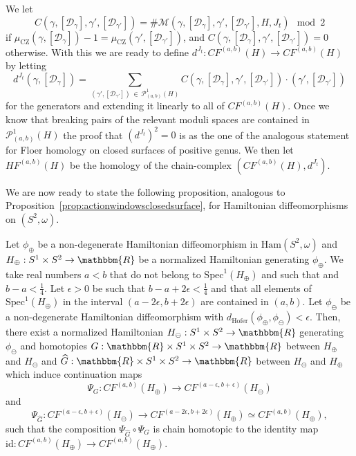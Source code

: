 \documentclass[AHL,Unicode,longabstracts,published]{cedram}
\newcommand{\R}{\mathbbm{R}}
\newcommand{\Ham}{\mathrm{Ham}}
\newcommand{\hofer}{\mathrm{Hofer}}
\newcommand{\Spec}{\mathrm{Spec}}
\newcommand{\rid}{\mathrm{id}}
\newcommand{\rCZ}{\mathrm{CZ}}
\newcommand{\clP}{\mathcal{P}}
\newcommand{\clM}{\mathcal{M}}
\newcommand{\clD}{\mathcal{D}}
\newcommand{\hofer}{\mathrm{Hofer}}
\begin{document}
We let
\[
C\left(\gamma, [\clD_\gamma],\gamma', [\clD_{\gamma'}]\right)= \# \clM\left(\gamma, [\clD_\gamma],\gamma', [\clD_{\gamma'}],H,J_t\right) \mod 2
\]
if $\mu_{\rCZ}(\gamma, [\clD_\gamma])- 1 = \mu_{\rCZ}(\gamma', [\clD_{\gamma'}])$, and $C(\gamma, [\clD_\gamma],\gamma', [\clD_{\gamma'}])=0$ otherwise. With this we are ready to define $d^{J_t}: CF^{(a,b)}(H) \to CF^{(a,b)}(H)$ by letting
\[
d^{J_t}(\gamma, [\clD_\gamma]) = \sum_{(\gamma', [\clD_{\gamma'}])\,\in\,\clP^1_{(a,b)}(H)} C\left(\gamma, [\clD_\gamma],\gamma', [\clD_{\gamma'}]\right) \cdot \left(\gamma', [\clD_{\gamma'}]\right)
\]
for the generators and extending it linearly to all of $CF^{(a,b)}(H)$.
Once we know that breaking pairs of the relevant moduli spaces are contained in $\clP^1_{(a,b)}(H)$ the proof that $(d^{J_t})^2 = 0$ is as the one of the analogous statement for Floer homology on closed surfaces of positive genus. We then let $HF^{(a,b)}(H)$ be the homology of the chain-complex $(CF^{(a,b)}(H),d^{J_t})$.

We are now ready to state the following proposition, analogous to Proposition~\ref{prop:actionwindowsclosedsurface}, for Hamiltonian diffeomorphisms on $(S^2,\omega)$.

\begin{prop}\label{prop:chainisosphere}
Let $\phi_\oplus$ be a non-degenerate Hamiltonian diffeomorphism in $\Ham(S^2,\omega)$ and $H_\oplus:S^1 \times S^2 \to \R$ be a normalized Hamiltonian generating $\phi_\oplus$. We take real numbers $a<b$ that do not belong to $\Spec^1(H_\oplus)$ and such that and $b-a< \frac{1}{4}$. Let $\epsilon>0$ be such that $b-a + 2\epsilon < \frac{1}{4}$ and that all elements of $\Spec^1(H_\oplus)$ in the interval $(a-2\epsilon, b+2\epsilon)$ are contained in $(a,b)$. Let $\phi_\ominus$ be a non-degenerate Hamiltonian diffeomorphism with $d_{\hofer}(\phi_\oplus, \phi_\ominus)< \epsilon$. Then, there exist a normalized Hamiltonian $H_\ominus: S^1 \times S^2 \to \R $ generating $\phi_\ominus$ and homotopies $G: \R \times S^1 \times S^2 \to \R $ between $H_\oplus$ and $H_\ominus$ and $\widehat{G}: \R \times S^1 \times S^2 \to \R $ between $H_\ominus$ and $H_\oplus$ which induce continuation maps
\[
\Psi_G: CF^{(a,b)}(H_\oplus) \to CF^{(a-\epsilon, b+\epsilon)}(H_\ominus)
\]
and
\[
\Psi_{\widehat{G}}: CF^{(a-\epsilon, b+\epsilon)}(H_\ominus) \to CF^{(a-2\epsilon,b+2\epsilon)}(H_\oplus) \simeq CF^{(a,b)}(H_\oplus),
\]
such that the composition $\Psi_{\widehat{G}}\circ \Psi_G$ is chain homotopic to the identity map ${\rid}: CF^{(a,b)}(H_\oplus) \to CF^{(a,b)}(H_\oplus) $.
\end{prop}
\end{document}
